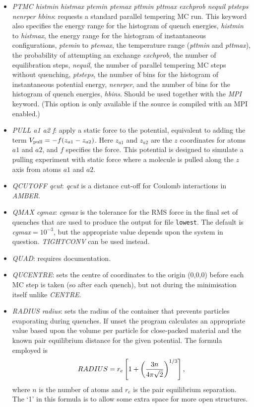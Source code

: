 \documentclass[12pt,a4paper,dvips]{article}
\begin{document}
\begin{itemize}
\item {\it PTMC histmin histmax ptemin ptemax pttmin pttmax exchprob nequil ptsteps nenrper hbins\/}: 
requests a standard parallel tempering MC run.
This keyword also specifies the energy range for the histogram of quench energies,
{\it histmin\/} to {\it histmax\/},
the energy range for the histogram of instantaneous configurations, {\it ptemin} to {\it ptemax}, 
the temperature range ({\it pttmin} and {\it pttmax}), 
the probability of attempting an exchange {\it exchprob}, the 
number of equilibration steps, {\it nequil},
the number of parallel tempering MC steps without quenching,  {\it ptsteps},
the number of bins for the histogram of instantaneous potential energy, {\it nenrper}, and
the number of bins for the histogram of quench energies, {\it hbins}.
Should be used together with the {\it MPI\/} keyword. %
(This option is only available if the source is compiled with an MPI enabled.)  

\item {\it PULL a1 a2 f\/}: apply a static force to the potential, equivalent to adding
the term $V_{\rm pull}=-f(z_{a1}-z_{a2})$. Here $z_{a1}$ and $z_{a2}$ are the $z$
coordinates for atoms $a1$ and $a2$, and $f$ specifies the force.
This potential is designed to simulate a pulling experiment with static force where
a molecule is pulled along the $z$ axis from atoms $a1$ and $a2$.

\item {\it QCUTOFF qcut\/}: {\it qcut\/} is a distance cut-off for Coulomb interactions in {\it AMBER\/}.

\item {\it QMAX cgmax\/}: {\it cgmax\/} is the tolerance for the 
RMS force in the final set of quenches that are used to produce
the output for file {\tt lowest}. The default is 
{\it cgmax\/}$=10^{-3}$, but the appropriate value depends upon the system in question.
{\it TIGHTCONV} can be used instead.

\item {\it QUAD\/}: requires documentation.

\item {\it QUCENTRE\/}: sets the centre of coordinates to the origin (0,0,0) before each MC step is taken (so after each quench), but not during the minimisation itself unlike {\it CENTRE}. 

\item {\it RADIUS radius\/}: sets the radius of the container that prevents particles
evaporating during quenches. If unset the program calculates an appropriate value
based upon the volume per particle for close-packed material and the known pair
equilibrium distance for the given potential. The formula employed is
$$  RADIUS=r_e\left[1 + \left(3 n \over 4\pi\sqrt{2}\right)^{1/3}\right], $$
where $n$ is the number of atoms and $r_e$ is the pair equilibrium
separation.\cite{kittel76} The `1' in this formula is to allow some extra space for
more open structures.


\end{itemize}
\end{document}

